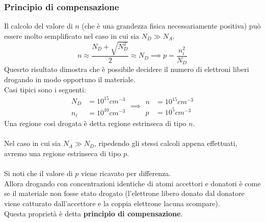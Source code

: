 \documentclass[../main.tex]{subfiles}
\begin{document}
	\subsubsection{Principio di compensazione}
	Il calcolo del valore di $n$ (che è una grandezza fisica necessariamente positiva) può essere molto semplificato nel caso in cui sia $N_D \gg N_A$.
	$$n \approx \frac{N_D + \sqrt{N_D^2}}{2} \approx N_D \implies p = \frac{n_i^2}{N_D}$$
	Quesrto risultato dimostra che è possibile decidere il numero di elettroni liberi drogando in modo opportuno il materiale. \\
	Casi tipici sono i seguenti:
	$$\begin{aligned} N_D &= 10^{15} cm^{-3} \\ n_i &= 10^{10} cm^{-3} \end{aligned} \implies \begin{aligned} n &= 10^{15} cm^{-3} \\ p &= 10^5 cm^{-3} \end{aligned}$$
	Una regione così drogata è detta regione estrinseca di tipo $n$.\\\\
	Nel caso in cui sia $N_A \gg N_D$, ripedendo gli stessi calcoli appena effettuati, avremo una regione estrinseca di tipo $p$.\\\\
	Si noti che il valore di $p$ viene ricavato per differenza. \\
	Allora drogando con concentrazioni identiche di atomi accettori e donatori è come se il materiale non fosse stato drogato (l’elettrone libero donato dal donatore viene catturato dall’accettore e la coppia elettrone lacuna scompare). \\
	Questa proprietà è detta \textbf{principio di compensazione}.
\end{document}
